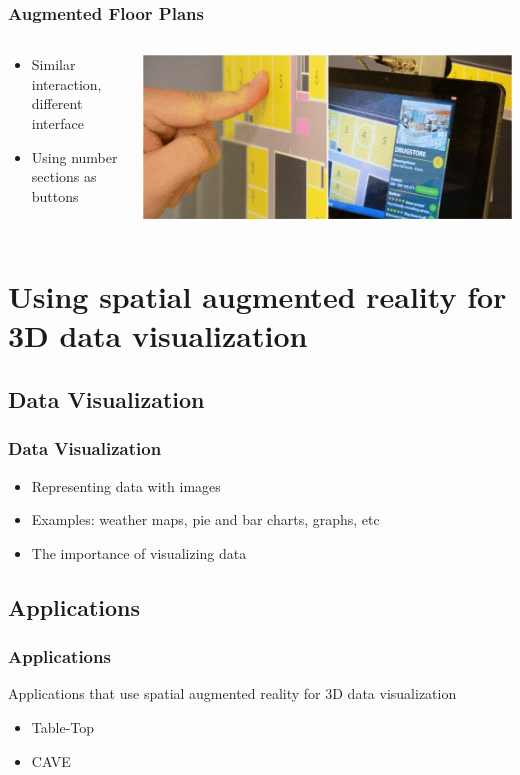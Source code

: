 \documentclass{beamer}
\begin{document}
\begin{frame}
	\frametitle{Augmented Floor Plans}
	\begin{columns}
	\begin{column}{0.45\textwidth}
	\begin{itemize}
		\item Similar interaction, different interface
		\item Using number sections as buttons
	\end{itemize}
	\end{column}
	\begin{column}{0.55\textwidth}
	\includegraphics[width=\textwidth]{images/AugmentedFloorPlans}
	\end{column}
	\end{columns}
	
\end{frame}

\section[Using spatial augmented reality for 3D data visualization]{Using spatial augmented reality for 3D data visualization}

\subsection{Data Visualization}
\begin{frame}	
\frametitle{Data Visualization}
	\begin{itemize}
		\item Representing data with images
		\item Examples: weather maps, pie and bar charts, graphs, etc
		\item The importance of visualizing data
	\end{itemize}
\end{frame}

\subsection{Applications}
\begin{frame}
\frametitle{Applications}
	Applications that use spatial augmented reality for 3D data visualization   
	\begin{itemize}
		\item Table-Top
		\item CAVE
	\end{itemize}
\end{frame}
\end{document}
